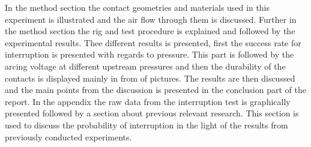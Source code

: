 \documentclass[10pt,a4paper,twoside]{article}
\begin{document}
In the method section the contact geometries and materials used in this experiment is illustrated and the air flow through them is discussed. Further in the method section the rig and test procedure is explained and followed by the experimental results. Thee different results is presented, first the success rate for interruption is presented with regards to pressure. This part is followed by the arcing voltage at different upstream pressures and then the durability of the contacts is displayed mainly in from of pictures. The results are then discussed and the main points from the discussion is presented in the conclusion part of the report. In the appendix the raw data from the interruption test is graphically presented followed by a section about previous relevant research. This section is used to discuss the probability of interruption in the light of the results from previously conducted experiments.
\end{document}
